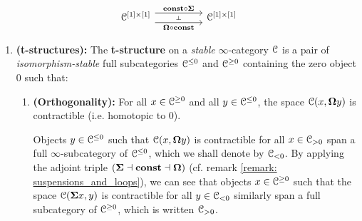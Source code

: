 \begin{remark}
                        $$
                            \begin{tikzcd}
                            	{\C^{[1] \x [1]}} && {\C^{[1] \x [1]}}
                            	\arrow[""{name=0, anchor=center, inner sep=0}, "{\loopspace \circ \const}"', shift right=2, from=1-1, to=1-3]
                            	\arrow[""{name=1, anchor=center, inner sep=0}, "{\const \circ \suspension}", shift left=2, from=1-1, to=1-3]
                            	\arrow["\dashv"{anchor=center, rotate=-90}, draw=none, from=1, to=0]
                            \end{tikzcd}
                        $$
                \end{remark}
            
                \begin{definition}[t-structures] \label{def: t_structures}   
                    \noindent {}
                    \begin{enumerate}
                        \item \textbf{(t-structures):} The \textbf{t-structure} on a \textit{stable} $\infty$-category $\mathcal{C}$ is a pair of \textit{isomorphism-stable} full subcategories $\mathcal{C}^{\leq 0}$ and $\mathcal{C}^{\geq 0}$ containing the zero object $0$ such that:
                            \begin{enumerate}
                                \item \textbf{(Orthogonality):} For all $x \in \mathcal{C}^{\geq 0}$ and all $y \in \mathcal{C}^{\leq 0}$, the space $\mathcal{C}(x, \mathbf{\Omega} y)$ is contractible (i.e. homotopic to $0$). 
                                
                                Objects $y \in \mathcal{C}^{\leq 0}$ such that $\mathcal{C}(x, \mathbf{\Omega} y)$ is contractible for all $x \in \mathcal{C}_{> 0}$ span a full $\infty$-subcategory of $\mathcal{C}^{\leq 0}$, which we shall denote by $\mathcal{C}_{< 0}$. By applying the adjoint triple $(\mathbf{\Sigma} \dashv \mathbf{const} \dashv \mathbf{\Omega})$ (cf. remark \ref{remark: suspensions_and_loops}), we can see that objects $x \in \mathcal{C}^{\geq 0}$ such that the space $\mathcal{C}(\mathbf{\Sigma} x, y)$ is contractible for all $y \in \mathcal{C}_{< 0}$ similarly span a full subcategory of $\mathcal{C}^{\geq 0}$, which is written $\mathcal{C}_{> 0}$. 
                                

\end{enumerate}
\end{enumerate}
\end{definition}
